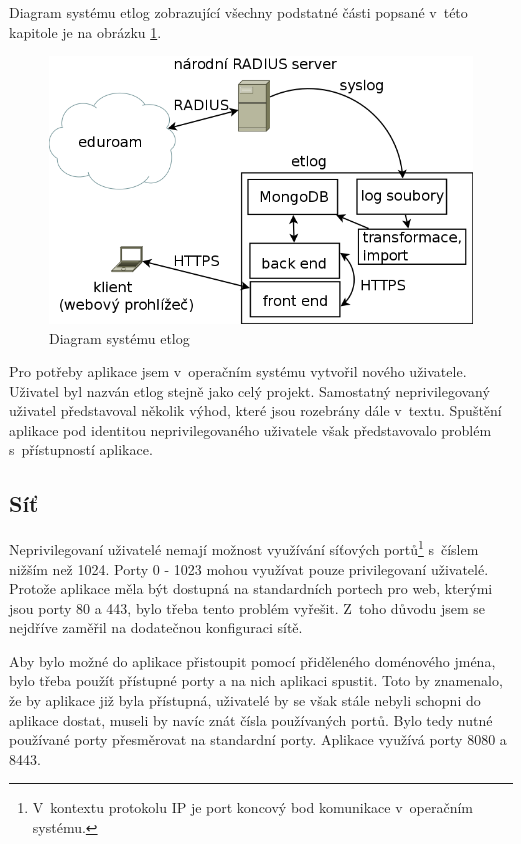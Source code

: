 \documentclass[thesis=M,czech]{FITthesis}[2012/06/26]
\begin{document}
    Diagram systému etlog zobrazující všechny podstatné části popsané v~této kapitole
    je na obrázku \ref{fig:etlog_diagram}.

    \begin{figure}
      \centering
        \includegraphics[scale=0.5]{etlog_diagram.png}
      \caption[Diagram systému etlog]{Diagram systému etlog}
      \label{fig:etlog_diagram}
    \end{figure}

    Pro potřeby aplikace jsem v~operačním systému vytvořil nového uživatele.
    Uživatel byl nazván etlog stejně jako celý projekt.
    Samostatný neprivilegovaný uživatel představoval několik výhod, které jsou rozebrány dále v~textu.
    Spuštění aplikace pod identitou neprivilegovaného uživatele však představovalo problém s~přístupností aplikace.
 
    \subsection{Síť}
    
      Neprivilegovaní uživatelé nemají možnost využívání síťových
      portů\footnote{
        V~kontextu protokolu IP je port koncový bod komunikace v~operačním systému.
      }
      s~číslem nižším než 1024.
      Porty 0 - 1023 mohou využívat pouze privilegovaní uživatelé.
      Protože aplikace měla být dostupná na standardních portech pro web,
      kterými jsou porty 80 a 443, bylo třeba tento problém vyřešit.
      Z~toho důvodu jsem se nejdříve zaměřil na dodatečnou konfiguraci sítě.

      Aby bylo možné do aplikace přistoupit pomocí přiděleného doménového jména,
      bylo třeba použít přístupné porty a na nich aplikaci spustit.
      Toto by znamenalo, že by aplikace již byla přístupná,
      uživatelé by se však stále nebyli schopni do aplikace dostat,
      museli by navíc znát čísla používaných portů.
      Bylo tedy nutné používané porty přesměrovat na standardní porty.
      Aplikace využívá porty 8080 a 8443.
     
\end{document}
